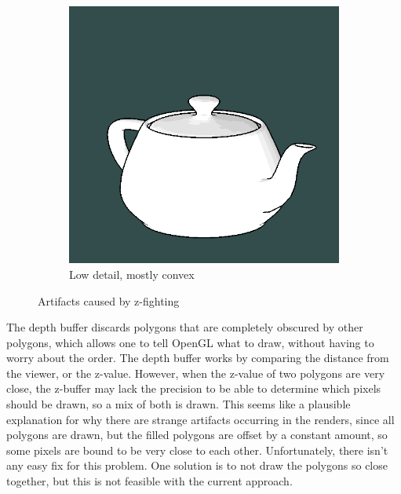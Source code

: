 \begin{figure}[h]
\begin{subfigure}[b]{0.35\textwidth}
        \includegraphics[width=\textwidth]{img/z-fighting-teapot}
        \caption{Low detail, mostly convex}
        \label{fig:z-fighting-low}
    \end{subfigure}
    \caption{Artifacts caused by z-fighting}
    \label{fig:z-fighting}
\end{figure}

The depth buffer discards polygons that are completely obscured by other polygons, which allows one to tell OpenGL 
what to draw, without having to worry about the order. The depth buffer works by comparing the distance from the viewer, or 
the z-value. However, when the z-value of two polygons are very close, the z-buffer may lack the precision to be able to 
determine which pixels should be drawn, so a mix of both is drawn. This seems like a plausible explanation for why there are 
strange artifacts occurring in the renders, since all polygons are drawn, but the filled polygons are offset by a constant 
amount, so some pixels are bound to be very close to each other. Unfortunately, there isn't any easy fix for this problem. 
One solution is to not draw the polygons so close together, but this is not feasible with the current approach.